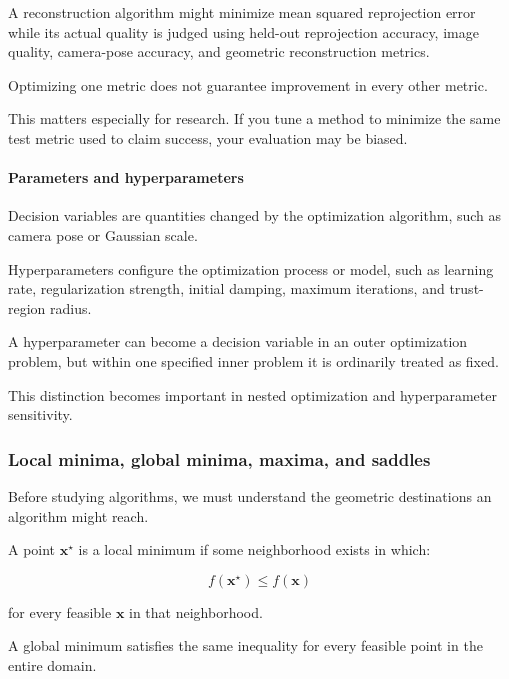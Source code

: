 A reconstruction algorithm might minimize mean squared reprojection error while its actual quality is judged using held-out reprojection accuracy, image quality, camera-pose accuracy, and geometric reconstruction metrics.

Optimizing one metric does not guarantee improvement in every other metric.

This matters especially for research. If you tune a method to minimize the same test metric used to claim success, your evaluation may be biased.

\paragraph{Parameters and hyperparameters}\label{02-foundations-ii-ch026-parameters-and-hyperparameters}

\hypertarget{02-foundations-ii-ch026-parameters-and-hyperparameters}{}

Decision variables are quantities changed by the optimization algorithm, such as camera pose or Gaussian scale.

Hyperparameters configure the optimization process or model, such as learning rate, regularization strength, initial damping, maximum iterations, and trust-region radius.

A hyperparameter can become a decision variable in an outer optimization problem, but within one specified inner problem it is ordinarily treated as fixed.

This distinction becomes important in nested optimization and hyperparameter sensitivity.

\subsubsection{Local minima, global minima, maxima, and saddles}\label{02-foundations-ii-ch026-local-minima-global-minima-maxima-and-saddles}

\hypertarget{02-foundations-ii-ch026-local-minima-global-minima-maxima-and-saddles}{}

Before studying algorithms, we must understand the geometric destinations an algorithm might reach.

A point \(\mathbf x^\star\) is a local minimum if some neighborhood exists in which:

\[
f(\mathbf x^\star)\le f(\mathbf x)
\]

for every feasible \(\mathbf x\) in that neighborhood.

A global minimum satisfies the same inequality for every feasible point in the entire domain.

